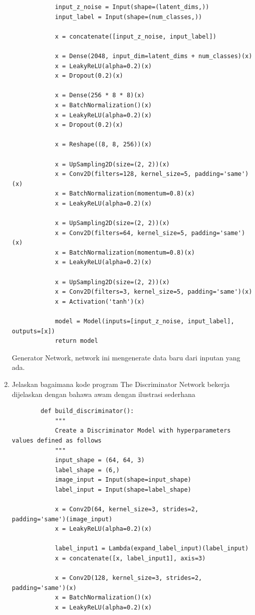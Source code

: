\begin{enumerate}
\begin{lstlisting}
            input_z_noise = Input(shape=(latent_dims,))
            input_label = Input(shape=(num_classes,))

            x = concatenate([input_z_noise, input_label])

            x = Dense(2048, input_dim=latent_dims + num_classes)(x)
            x = LeakyReLU(alpha=0.2)(x)
            x = Dropout(0.2)(x)

            x = Dense(256 * 8 * 8)(x)
            x = BatchNormalization()(x)
            x = LeakyReLU(alpha=0.2)(x)
            x = Dropout(0.2)(x)

            x = Reshape((8, 8, 256))(x)

            x = UpSampling2D(size=(2, 2))(x)
            x = Conv2D(filters=128, kernel_size=5, padding='same')(x)
            x = BatchNormalization(momentum=0.8)(x)
            x = LeakyReLU(alpha=0.2)(x)

            x = UpSampling2D(size=(2, 2))(x)
            x = Conv2D(filters=64, kernel_size=5, padding='same')(x)
            x = BatchNormalization(momentum=0.8)(x)
            x = LeakyReLU(alpha=0.2)(x)

            x = UpSampling2D(size=(2, 2))(x)
            x = Conv2D(filters=3, kernel_size=5, padding='same')(x)
            x = Activation('tanh')(x)

            model = Model(inputs=[input_z_noise, input_label], outputs=[x])
            return model
    \end{lstlisting}
    Generator Network, network ini mengenerate data baru dari inputan yang ada.
    \item Jelaskan bagaimana kode program The Discriminator Network bekerja dijelaskan dengan bahawa awam dengan ilustrasi sederhana
    \begin{lstlisting}
        def build_discriminator():
            """
            Create a Discriminator Model with hyperparameters values defined as follows
            """
            input_shape = (64, 64, 3)
            label_shape = (6,)
            image_input = Input(shape=input_shape)
            label_input = Input(shape=label_shape)

            x = Conv2D(64, kernel_size=3, strides=2, padding='same')(image_input)
            x = LeakyReLU(alpha=0.2)(x)

            label_input1 = Lambda(expand_label_input)(label_input)
            x = concatenate([x, label_input1], axis=3)

            x = Conv2D(128, kernel_size=3, strides=2, padding='same')(x)
            x = BatchNormalization()(x)
            x = LeakyReLU(alpha=0.2)(x)


\end{lstlisting}
\end{enumerate}
